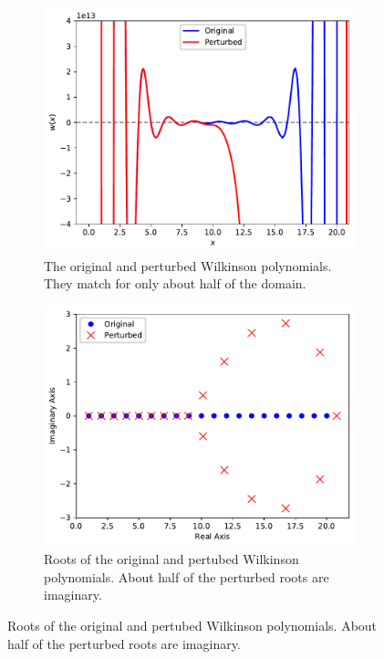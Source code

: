 \begin{figure}[H] %
\captionsetup[subfigure]{justification=centering}
\centering
\begin{subfigure}{.4\textwidth}
    \centering
    \includegraphics[width=\linewidth]{figures/perturbed_poly.pdf}
    \caption{The original and perturbed Wilkinson polynomials.
    They match for only about half of the domain.}
\end{subfigure}
\qquad
\begin{subfigure}{.4\textwidth}
    \centering
    \includegraphics[width=\linewidth]{figures/perturbed_roots.pdf}
    \caption{Roots of the original and pertubed Wilkinson polynomials.
    About half of the perturbed roots are imaginary.}
    \label{fig:pertubed-roots}
\end{subfigure}
\label{fig:wilkinsonpolynomial}
\end{figure}


